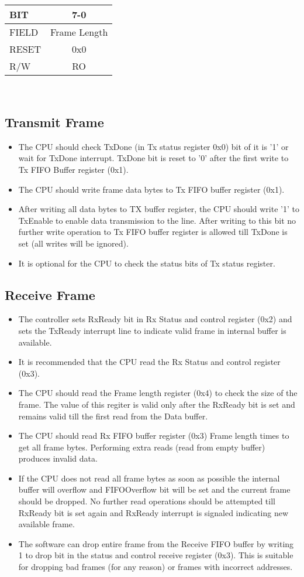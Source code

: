 \documentclass[a4paper,11pt]{article}
\begin{document}
\begin{tabular}{|l||c|}
\hline
\hline
BIT   & 7-0\\ 
\hline
FIELD & Frame Length\\
\hline
RESET & 0x0\\
\hline
R/W   & RO\\
\hline
\end{tabular}\\

\subsection{Transmit Frame}
\begin{itemize}
\item The CPU should check TxDone (in Tx status register 0x0) bit of it is '1' or wait for TxDone interrupt. TxDone bit is reset to '0' after the first write to Tx FIFO Buffer register (0x1). 
\item The CPU should write frame data bytes to Tx FIFO buffer register (0x1).
\item After writing all data bytes to TX buffer register, the CPU should write '1' to TxEnable to enable data transmission to the line. After writing to this bit no further write operation to Tx FIFO buffer register is allowed till TxDone is set (all writes will be ignored).
\item It is optional for the CPU to check the status bits of Tx status register.
\end{itemize}

\subsection{Receive Frame}
\begin{itemize}
\item The controller sets RxReady bit in Rx Status and control register (0x2) and sets the TxReady interrupt line to indicate valid frame in internal buffer is available.
\item It is recommended that the CPU read the Rx Status and control register (0x3).
\item The CPU should read the Frame length register (0x4) to check the size of the frame. The value of this regiter is valid only after the RxReady bit is set and remains valid till the first read from the Data buffer.
\item The CPU should read Rx FIFO buffer register (0x3) Frame length times to get all frame bytes. Performing extra reads (read from empty buffer) produces invalid data.
\item If the CPU does not read all frame bytes as soon as possible the internal buffer will overflow and FIFOOverflow bit will be set and the current frame should be dropped. No further read operations should be attempted till RxReady bit is set again and RxReady interrupt is signaled indicating new available frame.
\item The software can drop entire frame from the Receive FIFO buffer by writing 1 to drop bit in the status and control receive register (0x3). This is suitable for dropping bad frames (for any reason) or frames with incorrect addresses.
\end{itemize}
\end{document}
